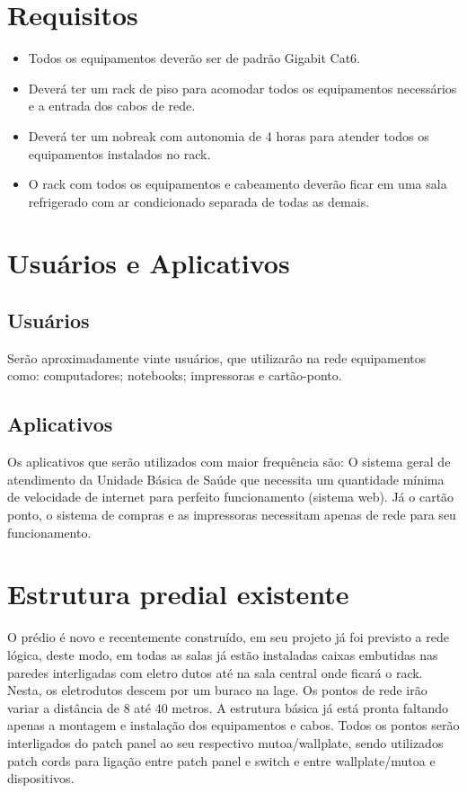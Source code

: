 \documentclass[	DIV=calc,%
							paper=a4,%
							fontsize=12pt,%
							onecolumn]{scrartcl}	 					%
\begin{document}
\section{Requisitos}
\begin{itemize}
\item Todos os equipamentos deverão ser de padrão Gigabit Cat6.
\item Deverá ter um rack de piso para acomodar todos os equipamentos necessários e a entrada dos cabos de rede.
\item Deverá ter um nobreak com autonomia de 4 horas para atender todos os equipamentos instalados no rack.
\item O rack com todos os equipamentos e cabeamento deverão ficar em uma sala refrigerado com ar condicionado separada de todas as demais.	
\end{itemize}

\section{Usuários e Aplicativos}
 
\subsection{Usuários}
Serão aproximadamente vinte usuários, que utilizarão na rede equipamentos como: computadores; notebooks; impressoras e cartão-ponto.

\subsection{Aplicativos}
Os aplicativos que serão utilizados com maior frequência são: O sistema geral de atendimento da Unidade Básica de Saúde que necessita um quantidade mínima de velocidade de internet para perfeito funcionamento (sistema web). Já o cartão ponto, o sistema de compras e as impressoras necessitam apenas de rede para seu funcionamento.

\section{Estrutura predial existente}
O prédio é novo e recentemente construído, em seu projeto já foi previsto a rede lógica, deste modo, em todas as salas já estão instaladas caixas embutidas nas paredes interligadas com eletro dutos até na sala central onde ficará o rack. Nesta, os eletrodutos descem por um buraco na lage. Os pontos de rede irão variar a distância de 8 até 40 metros. A estrutura básica já está pronta faltando apenas a montagem e instalação dos equipamentos e cabos. Todos os pontos serão interligados do patch panel ao seu respectivo mutoa/wallplate, sendo utilizados patch cords para ligação entre patch panel e switch e entre wallplate/mutoa e dispositivos. 
\end{document}
